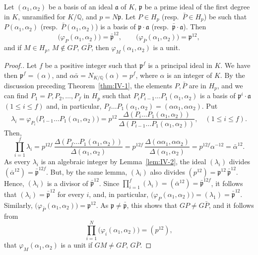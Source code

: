 \begin{theorem}\label{thm:IV-1}
Let $(\alpha_{1},\alpha_{2})$ be a basis of an ideal $\mathfrak{a}$ of
$K$, $\mathfrak{p}$ be a prime ideal of the first degree in $K$,
unramified for $K/\mathbb{Q}$, and $p=N\mathfrak{p}$. Let $P\in H_{p}$
(resp.\ $\bar{P}\in H_{p}$) be such that $P(\alpha_{1},\alpha_{2})$
(resp.\ $\bar{P}(\alpha_{1},\alpha_{2})$) is a basis of
$\mathfrak{p}\cdot\mathfrak{a}$ (resp.\ $\bar{\mathfrak{p}}\cdot
\mathfrak{a}$). Then
\[
\bigl(\varphi_{P}(\alpha_{1},\alpha_{2})\bigr)
=\bar{\mathfrak{p}}^{12},
\qquad
\bigl(\varphi_{\bar{P}}(\alpha_{1},\alpha_{2})\bigr)
=\mathfrak{p}^{12},
\]
and if $M\in H_{p}$, $M\notin GP$, $G\bar{P}$, then
$\varphi_{M}(\alpha_{1},\alpha_{2})$ is a unit.
\end{theorem}

\begin{proof}[Proof.]
Let $f$ be a positive integer such that $\mathfrak{p}^{f}$ is a principal
ideal in $K$. We have then $\mathfrak{p}^{f}=(\alpha)$, and
$\alpha\bar{\alpha}=N_{K/\mathbb{Q}}(\alpha)=p^{f}$, where $\alpha$ is an
integer of $K$. By the discussion preceding Theorem~\ref{thm:IV-1}, the
elements $P,\bar{P}$ are in $H_{p}$, and we can find
$P_{1}=P,P_{2},\ldots,P_{f}$ in $H_{p}$ such that
$P_{i}P_{i-1}\ldots P_{1}(\alpha_{1},\alpha_{2})$ is a basis of
$\mathfrak{p}^{i}\cdot\mathfrak{a}$ $(1\leq i\leq f)$ and, in particular,
$P_{f}\ldots P_{1}(\alpha_{1},\alpha_{2})=(\alpha\alpha_{1},\alpha\alpha_{2})$.
Put
\[
\lambda_{i}=\varphi_{P_{i}}\bigl(P_{i-1}\ldots P_{1}(\alpha_{1},\alpha_{2})\bigr)
=p^{12}\,\frac{\Delta(P_{i}\ldots P_{1}(\alpha_{1},\alpha_{2}))}
{\Delta(P_{i-1}\ldots P_{1}(\alpha_{1},\alpha_{2}))},\quad(1\leq i\leq f).
\]
Then,
\[
\prod_{i=1}^{f}\lambda_{i}
=p^{12f}\,\frac{\Delta(P_{f}\dots P_{1}(\alpha_{1},\alpha_{2}))}
{\Delta(\alpha_{1},\alpha_{2})}
=p^{12f}\,\frac{\Delta(\alpha\alpha_{1},\alpha\alpha_{2})}
{\Delta(\alpha_{1},\alpha_{2})}
=p^{12f}\alpha^{-12}
=\bar{\alpha}^{12}.
\]
As every $\lambda_{i}$ is an algebraic integer by
Lemma~\ref{lem:IV-2}, the ideal $(\lambda_{i})$ divides
$(\overline{\alpha}^{12})=\bar{\mathfrak{p}}^{12f}$. But, by the same
lemma, $(\lambda_{i})$ also divides $(p^{12})
=\mathfrak{p}^{12}\,\bar{\mathfrak{p}}^{12}$. Hence, $(\lambda_{i})$ is a
divisor of $\bar{\mathfrak{p}}^{12}$. Since
$\prod_{i=1}^{f}(\lambda_{i})=(\overline{\alpha}^{12})
=\bar{\mathfrak{p}}^{12f}$, it follows that $(\lambda_{i})
=\bar{\mathfrak{p}}^{12}$ for every $i$, and, in particular,
$\bigl(\varphi_{P}(\alpha_{1},\alpha_{2})\bigr)=(\lambda_{1})
=\bar{\mathfrak{p}}^{12}$. Similarly,
$\bigl(\varphi_{\bar{P}}(\alpha_{1},\alpha_{2})\bigr)
=\mathfrak{p}^{12}$. As $\mathfrak{p}\neq\bar{\mathfrak{p}}$, this shows
that $GP\neq G\bar{P}$, and it follows from
\[
\prod_{i=1}^{N}\bigl(\varphi_{i}(\alpha_{1},\alpha_{2})\bigr)=(p^{12}),
\]
that $\varphi_{M}(\alpha_{1},\alpha_{2})$ is a unit if $GM\neq GP$,
$G\bar{P}$.
\end{proof}


